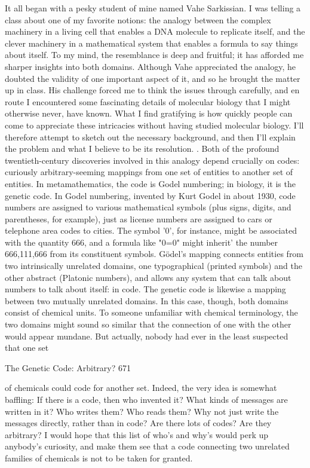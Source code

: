 It all began with a pesky student of mine named Vahe Sarkissian. I was telling a class
about one of my favorite notions: the analogy between the complex machinery in a
living cell that enables a DNA molecule to replicate itself, and the clever machinery
in a mathematical system that enables a formula to say things about itself. To my
mind, the resemblance is deep and fruitful; it has afforded me sharper insights into
both domains. Although Vahe appreciated the analogy, he doubted the validity of one
important aspect of it, and so he brought the matter up in class. His challenge forced
me to think the issues through carefully, and en route I encountered some fascinating
details of molecular biology that I might otherwise never, have known. What I find
gratifying is how quickly people can come to appreciate these intricacies without
having studied molecular biology. I'll therefore attempt to sketch out the necessary
background, and then I'll explain the problem and what I believe to be its resolution. .
Both of the profound twentieth-century discoveries involved in this analogy depend
crucially on codes: curiously arbitrary-seeming mappings from one set of entities to
another set of entities. In metamathematics, the code is Godel numbering; in biology,
it is the genetic code. In Godel numbering, invented by Kurt Godel in about 1930,
code numbers are assigned to various mathematical symbols (plus signs, digits, and
parentheses, for example), just as license numbers are assigned to cars or telephone
area codes to cities. The symbol '0', for instance, might be associated with the quantity
666, and a formula like "0=0" might inherit' the number 666,111,666 from its
constituent symbols. Gödel’s mapping connects entities from two intrinsically
unrelated domains, one typographical (printed symbols) and the other abstract
(Platonic numbers), and allows any system that can talk about numbers to talk about
itself: in code.
         The genetic code is likewise a mapping between two mutually unrelated
domains. In this case, though, both domains consist of chemical units. To someone
unfamiliar with chemical terminology, the two domains might sound so similar that
the connection of one with the other would appear mundane. But actually, nobody had
ever in the least suspected that one set




The Genetic Code: Arbitrary?                                                         671

of chemicals could code for another set. Indeed, the very idea is somewhat baffling: If
there is a code, then who invented it? What kinds of messages are written in it? Who
writes them? Who reads them? Why not just write the messages directly, rather than
in code? Are there lots of codes? Are they arbitrary? I would hope that this list of
who's and why's would perk up anybody's curiosity, and make them see that a code
connecting two unrelated families of chemicals is not to be taken for granted.

